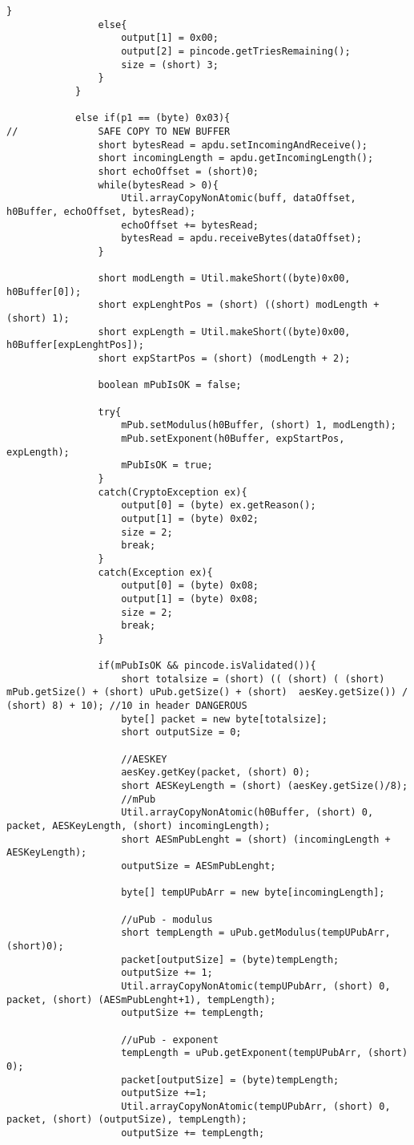 \begin{lstlisting}[caption=SecureCard.java.,breaklines=true,breakatwhitespace=false, label=lst:SecureCard,escapechar=!]
				}
				else{
					output[1] = 0x00;
					output[2] = pincode.getTriesRemaining();
					size = (short) 3;
				}
			}

			else if(p1 == (byte) 0x03){
//				SAFE COPY TO NEW BUFFER
				short bytesRead = apdu.setIncomingAndReceive();
				short incomingLength = apdu.getIncomingLength();
				short echoOffset = (short)0;
				while(bytesRead > 0){
					Util.arrayCopyNonAtomic(buff, dataOffset, h0Buffer, echoOffset, bytesRead);
					echoOffset += bytesRead;
		            bytesRead = apdu.receiveBytes(dataOffset);
				}

				short modLength = Util.makeShort((byte)0x00, h0Buffer[0]);
				short expLenghtPos = (short) ((short) modLength + (short) 1);
				short expLength = Util.makeShort((byte)0x00, h0Buffer[expLenghtPos]);
				short expStartPos = (short) (modLength + 2);

				boolean mPubIsOK = false;

				try{
					mPub.setModulus(h0Buffer, (short) 1, modLength);
					mPub.setExponent(h0Buffer, expStartPos, expLength);
					mPubIsOK = true;
				}
				catch(CryptoException ex){
					output[0] = (byte) ex.getReason();
					output[1] = (byte) 0x02;
					size = 2;
					break;
				}
				catch(Exception ex){
					output[0] = (byte) 0x08;
					output[1] = (byte) 0x08;
					size = 2;
					break;
				}

				if(mPubIsOK && pincode.isValidated()){
					short totalsize = (short) (( (short) ( (short) mPub.getSize() + (short) uPub.getSize() + (short)  aesKey.getSize()) / (short) 8) + 10); //10 in header DANGEROUS
					byte[] packet = new byte[totalsize];
					short outputSize = 0;

					//AESKEY
					aesKey.getKey(packet, (short) 0);
					short AESKeyLength = (short) (aesKey.getSize()/8);
					//mPub
					Util.arrayCopyNonAtomic(h0Buffer, (short) 0, packet, AESKeyLength, (short) incomingLength);
					short AESmPubLenght = (short) (incomingLength + AESKeyLength);
					outputSize = AESmPubLenght;

					byte[] tempUPubArr = new byte[incomingLength];

					//uPub - modulus
					short tempLength = uPub.getModulus(tempUPubArr, (short)0);
					packet[outputSize] = (byte)tempLength;
					outputSize += 1;
					Util.arrayCopyNonAtomic(tempUPubArr, (short) 0, packet, (short) (AESmPubLenght+1), tempLength);
					outputSize += tempLength;

					//uPub - exponent
					tempLength = uPub.getExponent(tempUPubArr, (short) 0);
					packet[outputSize] = (byte)tempLength;
					outputSize +=1;
					Util.arrayCopyNonAtomic(tempUPubArr, (short) 0, packet, (short) (outputSize), tempLength);
					outputSize += tempLength;


\end{lstlisting}
